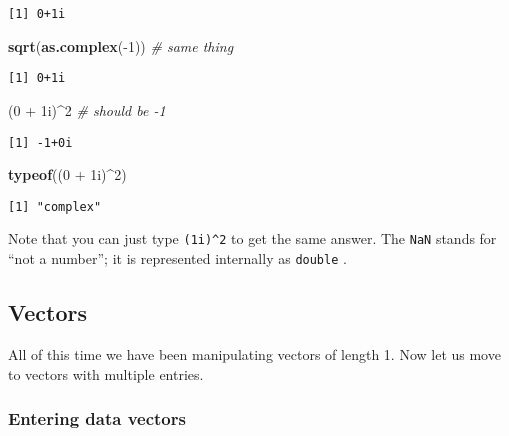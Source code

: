 \documentclass[]{book}
\newenvironment{Shaded}{\begin{snugshade}}{\end{snugshade}}
\newcommand{\KeywordTok}[1]{\textcolor[rgb]{0.13,0.29,0.53}{\textbf{{#1}}}}
\newcommand{\DecValTok}[1]{\textcolor[rgb]{0.00,0.00,0.81}{{#1}}}
\newcommand{\StringTok}[1]{\textcolor[rgb]{0.31,0.60,0.02}{{#1}}}
\newcommand{\CommentTok}[1]{\textcolor[rgb]{0.56,0.35,0.01}{\textit{{#1}}}}
\newcommand{\NormalTok}[1]{{#1}}
\numberwithin{equation}{chapter}
\numberwithin{figure}{chapter}
\theoremstyle{plain}
\theoremstyle{definition}
\theoremstyle{remark}
\theoremstyle{definition}
\theoremstyle{definition}
\theoremstyle{remark}
\begin{document}
\begin{verbatim}
[1] 0+1i
\end{verbatim}

\begin{Shaded}
\begin{Highlighting}[]
\KeywordTok{sqrt}\NormalTok{(}\KeywordTok{as.complex}\NormalTok{(-}\DecValTok{1}\NormalTok{))  }\CommentTok{# same thing}
\end{Highlighting}
\end{Shaded}

\begin{verbatim}
[1] 0+1i
\end{verbatim}

\begin{Shaded}
\begin{Highlighting}[]
\NormalTok{(}\DecValTok{0} \NormalTok{+}\StringTok{ }\NormalTok{1i)^}\DecValTok{2}            \CommentTok{# should be -1}
\end{Highlighting}
\end{Shaded}

\begin{verbatim}
[1] -1+0i
\end{verbatim}

\begin{Shaded}
\begin{Highlighting}[]
\KeywordTok{typeof}\NormalTok{((}\DecValTok{0} \NormalTok{+}\StringTok{ }\NormalTok{1i)^}\DecValTok{2}\NormalTok{)}
\end{Highlighting}
\end{Shaded}

\begin{verbatim}
[1] "complex"
\end{verbatim}

Note that you can just type \texttt{(1i)\^{}2} to get the same answer.
The \texttt{NaN}  stands for ``not a number'';
it is represented internally as \texttt{double} .

\subsection{Vectors}\label{sub-vectors}

All of this time we have been manipulating vectors of length 1. Now let
us move to vectors with multiple entries.

\subsubsection{Entering data vectors}\label{entering-data-vectors}
\end{document}
